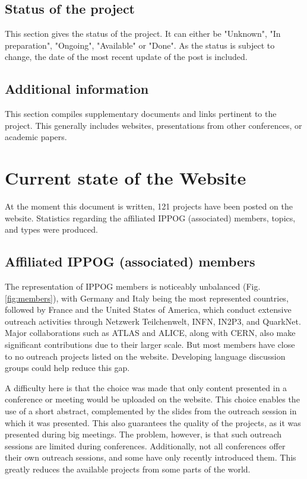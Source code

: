 \subsection*{Status of the project}
This section gives the status of the project. It can either be "Unknown", "In preparation", "Ongoing", "Available" or "Done". As the status is subject to change, the date of the most recent update of the post is included.

\subsection*{Additional information}
This section compiles supplementary documents and links pertinent to the project. This generally includes websites, presentations from other conferences, or academic papers.

\newpage
\section{Current state of the Website}\label{ssec:state}

At the moment this document is written, 121 projects have been posted on the website. Statistics regarding the affiliated IPPOG (associated) members, topics, and types were produced.

\subsection*{Affiliated IPPOG (associated) members}
The representation of IPPOG members is noticeably unbalanced (Fig. \ref{fig:members}), with Germany and Italy being the most represented countries, followed by France and the United States of America, which conduct extensive outreach activities through Netzwerk Teilchenwelt, INFN, IN2P3, and QuarkNet. Major collaborations such as ATLAS and ALICE, along with CERN, also make significant contributions due to their larger scale. But most members have close to no outreach projects listed on the website. Developing language discussion groups could help reduce this gap.

A difficulty here is that the choice was made that only content presented in a conference or meeting would be uploaded on the website. This choice enables the use of a short abstract, complemented by the slides from the outreach session in which it was presented. This also guarantees the quality of the projects, as it was presented during big meetings. The problem, however, is that such outreach sessions are limited during conferences. Additionally, not all conferences offer their own outreach sessions, and some have only recently introduced them. This greatly reduces the available projects from some parts of the world.

